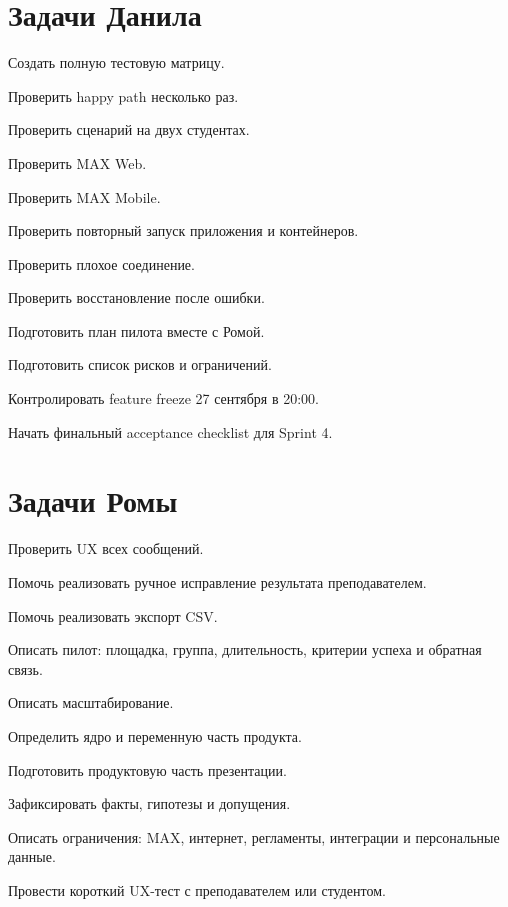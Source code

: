 \documentclass[11pt,a4paper]{article}
\begin{document}
\section{Задачи Данила}
\begin{tasklist}
  \item Создать полную тестовую матрицу.
  \item Проверить happy path несколько раз.
  \item Проверить сценарий на двух студентах.
  \item Проверить MAX Web.
  \item Проверить MAX Mobile.
  \item Проверить повторный запуск приложения и контейнеров.
  \item Проверить плохое соединение.
  \item Проверить восстановление после ошибки.
  \item Подготовить план пилота вместе с Ромой.
  \item Подготовить список рисков и ограничений.
  \item Контролировать feature freeze 27 сентября в 20:00.
  \item Начать финальный acceptance checklist для Sprint 4.
\end{tasklist}

\section{Задачи Ромы}
\begin{tasklist}
  \item Проверить UX всех сообщений.
  \item Помочь реализовать ручное исправление результата преподавателем.
  \item Помочь реализовать экспорт CSV.
  \item Описать пилот: площадка, группа, длительность, критерии успеха и обратная связь.
  \item Описать масштабирование.
  \item Определить ядро и переменную часть продукта.
  \item Подготовить продуктовую часть презентации.
  \item Зафиксировать факты, гипотезы и допущения.
  \item Описать ограничения: MAX, интернет, регламенты, интеграции и персональные данные.
  \item Провести короткий UX-тест с преподавателем или студентом.
\end{tasklist}
\end{document}
